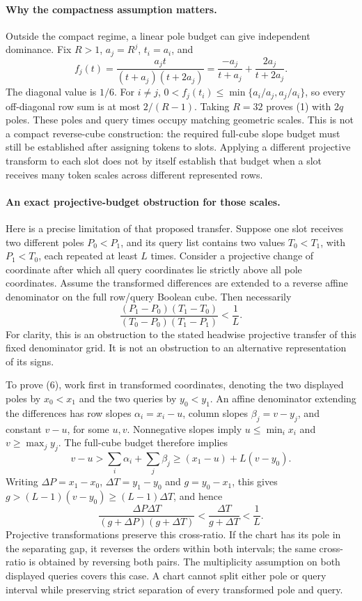 \documentclass[11pt]{article}
\begin{document}
\paragraph{Why the compactness assumption matters.}
Outside the compact regime, a linear pole budget can give independent
dominance. Fix $R>1$, $a_j=R^j$, $t_i=a_i$, and
\[
 f_j(t)=\frac{a_jt}{(t+a_j)(t+2a_j)}
       =\frac{-a_j}{t+a_j}+\frac{2a_j}{t+2a_j}.
\]
The diagonal value is $1/6$. For $i\ne j$,
$0<f_j(t_i)\leq\min\{a_i/a_j,a_j/a_i\}$, so every off-diagonal
row sum is at most $2/(R-1)$. Taking $R=32$ proves (1) with $2q$ poles.
These poles and query times occupy matching geometric scales. This is
not a compact reverse-cube construction: the required full-cube slope
budget must still be established after assigning tokens to slots.
Applying a different projective transform to each slot does not by
itself establish that budget when a slot receives many token scales
across different represented rows.

\paragraph{An exact projective-budget obstruction for those scales.}
Here is a precise limitation of that proposed transfer. Suppose one
slot receives two different poles $P_0<P_1$, and its query list contains
two values $T_0<T_1$, with $P_1<T_0$, each repeated at least $L$ times.
Consider a projective change of coordinate after which all query
coordinates lie strictly above all pole coordinates. Assume the
transformed differences are extended to a reverse affine denominator
on the full row/query Boolean cube. Then necessarily
\[
 \frac{(P_1-P_0)(T_1-T_0)}{(T_0-P_0)(T_1-P_1)}<\frac1L.
 \tag{6}
\]
For clarity, this is an obstruction to the stated headwise projective
transfer of this fixed denominator grid. It is not an obstruction to
an alternative representation of its signs.

To prove (6), work first in transformed coordinates, denoting the
two displayed poles by $x_0<x_1$ and the two queries by $y_0<y_1$.
An affine denominator extending the differences has row slopes
$\alpha_i=x_i-u$, column slopes $\beta_j=v-y_j$, and constant
$v-u$, for some $u,v$. Nonnegative slopes imply
$u\leq\min_i x_i$ and $v\geq\max_j y_j$. The full-cube budget
therefore implies
\[
 v-u>\sum_i\alpha_i+\sum_j\beta_j
 \geq (x_1-u)+L(v-y_0).
\]
Writing $\Delta P=x_1-x_0$, $\Delta T=y_1-y_0$ and $g=y_0-x_1$,
this gives $g>(L-1)(v-y_0)\geq(L-1)\Delta T$, and hence
\[
 \frac{\Delta P\Delta T}{(g+\Delta P)(g+\Delta T)}
 <\frac{\Delta T}{g+\Delta T}<\frac1L.
\]
Projective transformations preserve this cross-ratio. If the chart has its pole in
the separating gap, it reverses the orders within both intervals;
the same cross-ratio is obtained by reversing both pairs. The
multiplicity assumption on both displayed queries covers this case.
A chart cannot split either pole or query interval while preserving
strict separation of every transformed pole and query.
\end{document}
